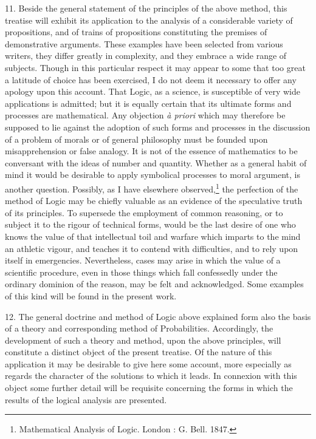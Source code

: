 \documentclass[oneside]{book}
\begin{document}
11. Beside the general statement of the principles of the
above method, this treatise will exhibit its application to the
analysis of a considerable variety of propositions, and of trains of
propositions constituting the premises of demonstrative arguments.
These examples have been selected from various writers,
they differ greatly in complexity, and they embrace a wide range
of subjects. Though in this particular respect it may appear to
some that too great a latitude of choice has been exercised, I do
not deem it necessary to offer any apology upon this account.
That Logic, as a science, is susceptible of very wide applications
is admitted; but it is equally certain that its ultimate forms and
processes are mathematical. Any objection \textit{\`{a} priori} which may
therefore be supposed to lie against the adoption of such forms
and processes in the discussion of a problem of morals or of general
philosophy must be founded upon misapprehension or false
analogy. It is not of the essence of mathematics to be conversant
with the ideas of number and quantity. Whether as a general
habit of mind it would be desirable to apply symbolical processes
to moral argument, is another question. Possibly, as I have
elsewhere observed,\footnote{Mathematical Analysis of Logic. London : G. Bell. 1847.}
the perfection of the method of Logic may
be chiefly valuable as an evidence of the speculative truth of its
principles. To supersede the employment of common reasoning,
or to subject it to the rigour of technical forms, would be the last
desire of one who knows the value of that intellectual toil and
warfare which imparts to the mind an athletic vigour, and teaches
it to contend with difficulties, and to rely upon itself in emergencies.
Nevertheless, cases may arise in which the value of a
scientific procedure, even in those things which fall confessedly
under the ordinary dominion of the reason, may be felt and acknowledged.
Some examples of this kind will be found in the
present work.

12. The general doctrine and method of Logic above explained
form also the basis of a theory and corresponding method
of Probabilities. Accordingly, the development of such a theory
and method, upon the above principles, will constitute a distinct
object of the present treatise. Of the nature of this application
it may be desirable to give here some account, more especially as
regards the character of the solutions to which it leads. In connexion
with this object some further detail will be requisite concerning
the forms in which the results of the logical analysis are
presented.
\end{document}
